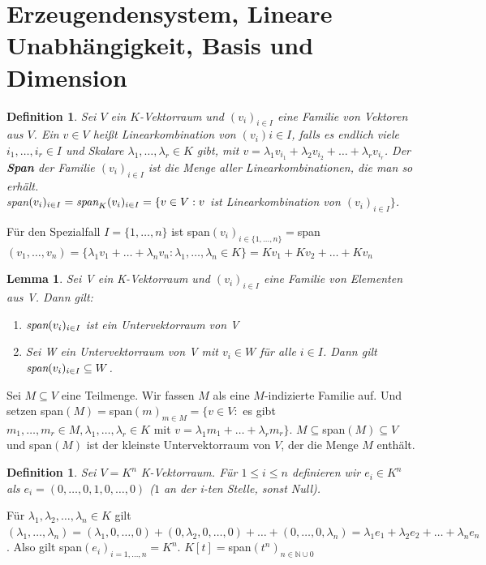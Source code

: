 \documentclass[12pt,a4paper]{article}
\theoremstyle{plain}
\newtheorem{Lemma}[Theorem]{Lemma}
\newtheorem{Definition}[Theorem]{Definition}
\newcommand{\herv}[1]{{\emph{\textbf{#1}}}}
\newcommand{\N}{\mathbb{N}}
\numberwithin{equation}{section}
\begin{document}
\section{Erzeugendensystem, Lineare Unabhängigkeit, Basis und Dimension}
\begin{Definition}
Sei $V$ ein $K$-Vektorraum und $(v_i)_{i\in I}$ eine Familie von Vektoren aus $V$. Ein $v\in V$ heißt Linearkombination von $(v_i){i\in I}$, falls es endlich viele $i_1,\ldots,i_r\in I$ und Skalare $\lambda_1,\ldots,\lambda_r\in K$ gibt, mit $v=\lambda_1 v_{i_1}+\lambda_2 v_{i_2}+\ldots+\lambda_r v_{i_r}$. Der \herv{Span} der Familie $(v_i)_{i\in I}$ ist die Menge aller Linearkombinationen, die man so erhält.\\
\emph{span}$(v_i)_{i\in I} = \emph{span}_K(v_i)_{i\in I}= \{v\in V: v$ ist Linearkombination von $(v_i)_{i\in I} \}$. 
\end{Definition}
Für den Spezialfall $I=\{1,\ldots,n\}$ ist span$(v_i)_{i\in \{1,\ldots,n\}}=$span$(v_1,\ldots,v_n)=\{\lambda_1 v_1 + \ldots + \lambda_n v_n : \lambda_1,\ldots,\lambda_n\in K\}=Kv_1+Kv_2+\ldots+Kv_n$
\begin{Lemma}
Sei V ein K-Vektorraum und $(v_i)_{i\in I}$ eine Familie von Elementen aus V. Dann gilt:
\begin{enumerate}
\renewcommand{\labelenumi}{\emph{\alph{enumi})}}
\item $\emph{span}(v_i)_{i\in I}$ ist ein Untervektorraum von V
\item Sei W ein Untervektorraum von V mit $v_i\in W$ für alle $i\in I$. Dann gilt $\emph{span}(v_i)_{i\in I}\subseteq W$.
\end{enumerate}
\end{Lemma}
Sei $M\subseteq V$ eine Teilmenge. Wir fassen $M$ als eine $M$-indizierte Familie auf. Und setzen span$(M)=$span$(m)_{m\in M}=\{v\in V:$ es gibt $m_1,\ldots,m_r\in M, \lambda_1,\ldots,\lambda_r\in K$ mit $v=\lambda_1m_1+\ldots+\lambda_rm_r\}$. $M\subseteq$span$(M)\subseteq V$ und span$(M)$ ist der kleinste Untervektorraum von $V$, der die Menge $M$ enthält.
\begin{Definition}
Sei $V=K^n$ K-Vektorraum. Für $1\leq i\leq n$ definieren wir $e_i\in K^n$ als $e_i=(0,\ldots,0,1,0,\ldots,0)$ ($1$ an der i-ten Stelle, sonst Null).
\end{Definition}
Für $\lambda_1,\lambda_2,\ldots,\lambda_n\in K$ gilt $(\lambda_1,\ldots,\lambda_n)=(\lambda_1,0,\ldots,0)+(0,\lambda_2,0,\ldots,0)+\ldots+(0,\ldots,0,\lambda_n)=\lambda_1e_1+\lambda_2e_2+\ldots+\lambda_ne_n$. Also gilt span$(e_i)_{i=1,\ldots,n}=K^n$. $K[t]=$span$(t^n)_{n\in\N\cup 0}$ \\
\end{document}

